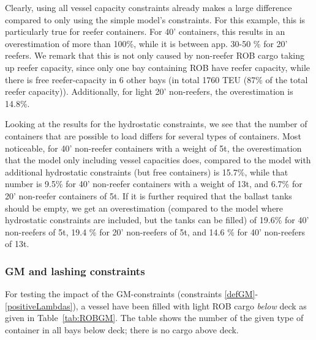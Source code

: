 Clearly, using all vessel capacity constraints already makes a large difference compared to only using the simple model's constraints. For this example, this is particularly true for reefer containers. For 40' containers, this results in an overestimation of more than 100\%, while it is between app. 30-50 \% for 20' reefers. We remark that this is not only caused by non-reefer ROB cargo taking up reefer capacity, since only one bay containing ROB have reefer capacity, while there is free reefer-capacity in 6 other bays (in total 1760 TEU (87\% of the total reefer capacity)).  Additionally, for light 20' non-reefers, the overestimation is 14.8\%.

Looking at the results for the hydrostatic constraints, we see that the number of containers that are possible to load differs for several types of containers. Most noticeable, for 40' non-reefer containers with a weight of 5t, the overestimation that the model only including vessel capacities does, compared to the model with additional hydrostatic constraints (but free containers) is 15.7\%, while that number is 9.5\% for 40' non-reefer containers with a weight of 13t, and 6.7\% for 20' non-reefer containers of 5t. If it is further required that the ballast tanks should be empty, we get an overestimation (compared to the model where hydrostatic constraints are included, but the tanks can be filled) of 19.6\% for 40' non-reefers of 5t, 19.4 \% for 20' non-reefers of 5t, and 14.6 \% for 40' non-reefers of 13t.

\subsubsection{GM and lashing constraints}
For testing the impact of the GM-constraints (constraints \eqref{defGM}-\eqref{positiveLambdas}), a vessel have been filled with light ROB cargo \emph{below} deck as given in Table~\ref{tab:ROBGM}. The table shows the number of the given type of container in all bays below deck; there is no cargo above deck.\\

